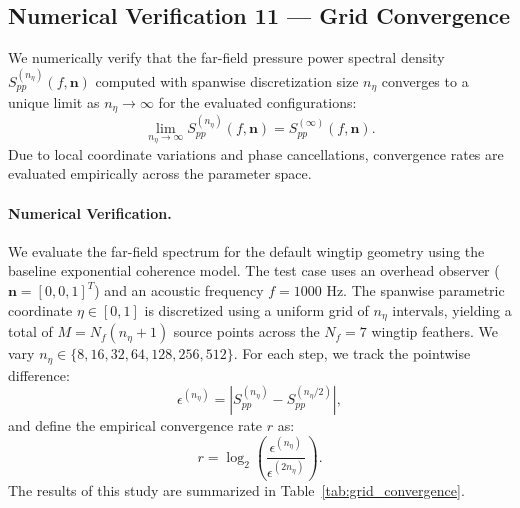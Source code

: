 \documentclass[11pt]{article}
\newcommand{\vect}[1]{\bm{#1}}
\begin{document}
\subsection{Numerical Verification 11 --- Grid Convergence}

We numerically verify that the far-field pressure power spectral density $S_{pp}^{(n_\eta)}(f, \vect{n})$ computed with spanwise discretization size $n_\eta$ converges to a unique limit as $n_\eta \to \infty$ for the evaluated configurations:
\begin{equation*}
    \lim_{n_\eta \to \infty} S_{pp}^{(n_\eta)}(f,\vect{n}) = S_{pp}^{(\infty)}(f,\vect{n}).
\end{equation*}
Due to local coordinate variations and phase cancellations, convergence rates are evaluated empirically across the parameter space.

\paragraph{Numerical Verification.}
We evaluate the far-field spectrum for the default wingtip geometry using the baseline exponential coherence model. The test case uses an overhead observer ($\vect{n} = [0, 0, 1]^T$) and an acoustic frequency $f = 1000$ Hz. The spanwise parametric coordinate $\eta \in [0, 1]$ is discretized using a uniform grid of $n_\eta$ intervals, yielding a total of $M = N_f(n_\eta + 1)$ source points across the $N_f = 7$ wingtip feathers.
We vary $n_\eta \in \{8, 16, 32, 64, 128, 256, 512\}$. For each step, we track the pointwise difference:
\begin{equation*}
    \epsilon^{(n_\eta)} = \left| S_{pp}^{(n_\eta)} - S_{pp}^{(n_\eta/2)} \right|,
\end{equation*}
and define the empirical convergence rate $r$ as:
\begin{equation*}
    r = \log_2 \left( \frac{\epsilon^{(n_\eta)}}{\epsilon^{(2n_\eta)}} \right).
\end{equation*}
The results of this study are summarized in Table~\ref{tab:grid_convergence}.
\end{document}
